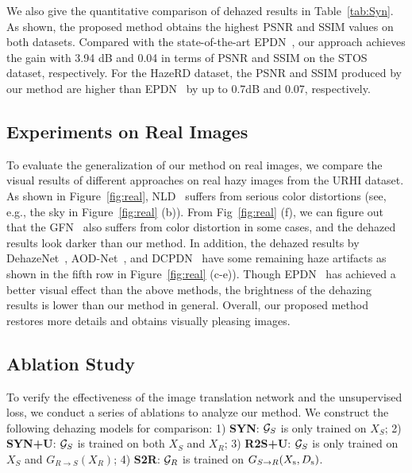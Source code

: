 \documentclass[10pt,twocolumn,letterpaper]{article}
\begin{document}
We also give the quantitative comparison of dehazed results in Table~\ref{tab:Syn}. As shown, the proposed method obtains the highest PSNR and SSIM values on both datasets.
Compared with the state-of-the-art EPDN~\cite{qu2019enhanced}, our approach achieves the gain with 3.94 dB and 0.04 in terms of PSNR and SSIM on the STOS dataset, respectively.
For the HazeRD dataset, the PSNR and SSIM produced by our method are higher than EPDN~\cite{qu2019enhanced} by up to 0.7dB and 0.07, respectively.


\subsection{Experiments on Real Images}
To evaluate the generalization of our method on real images, we compare the visual results of different approaches on real hazy images from the URHI dataset.
As shown in Figure~\ref{fig:real}, NLD~\cite{berman2016non} suffers from serious color distortions (see, e.g., the sky in Figure~\ref{fig:real} (b)). 
From Fig~\ref{fig:real} (f), we can figure out that the GFN~\cite{Ren_2018_CVPR} also suffers from color distortion in some cases, and the dehazed results look darker than our method. 
In addition, the dehazed results by DehazeNet~\cite{Cai2016DehazeNet}, AOD-Net~\cite{li2017aod}, and DCPDN~\cite{Zhang_2018_CVPR} have some remaining haze artifacts as shown in the fifth row in Figure~\ref{fig:real} (c-e)). 
Though EPDN~\cite{qu2019enhanced} has achieved a better visual effect than the above methods, the brightness of the dehazing results is lower than our method in general. 
Overall, our proposed method restores more details and obtains visually pleasing images.




 


\subsection{Ablation Study}
To verify the effectiveness of the image translation network and the unsupervised loss, we conduct a series of ablations to analyze our method.
We construct the following dehazing models for comparison: 1) \textbf{SYN}: ${{\cal G}_S}$ is only trained on ${X_S}$; 2) \textbf{SYN+U}: ${{\cal G}_S}$ is trained on both ${X_S}$ and ${X_R}$; 3) \textbf{R2S+U}: ${{\cal G}_S}$ is only trained on ${X_S}$ and ${G_{R \to S}}({X_R})$; 4) \textbf{S2R}: ${{\cal G}_R}$ is trained on ${G_{S \to R}}({X_{\rm{s}}},{D_{\rm{s}}})$.
\end{document}
